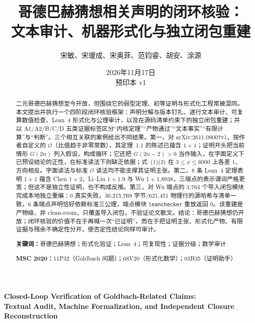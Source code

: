 \documentclass[11pt,a4paper]{ctexart}
\title{\bfseries 哥德巴赫猜想相关声明的闭环核验：\\[2pt]
文本审计、机器形式化与独立闭包重建}
\author{宋敏、宋瑷成、宋奥菲、范钧睿、胡安、涂源}
\date{2026年11月17日\\[2pt]
\small 预印本 v1}
\theoremstyle{plain}
\theoremstyle{definition}
\begin{document}
\maketitle

\begin{abstract}
\noindent
二元哥德巴赫猜想至今开放，但围绕它的弱型定理、初等证明与形式化工程常被混同。本文提出并执行一个四阶段闭环核验框架：声明分解与版本钉扎、逐行文本审计、可复算数值检查、Lean~4 形式化与公理审计，以及在源码清单约束下的独立闭包重建；并以 A1/A2/B/C/D 五类证据标签区分“内核定理”“产物通过”“文本事实”“有限计算”与“判断”。三个相互关联的案例给出不同结果。第一，对 arXiv:2611.09007v1，按作者自定义的 $\mathcal O$（比值趋于非零常数），其定理~1.1 的陈述已蕴含 $1+1$；证明开头把当前情形 $G(2n)$ 列入假设，构成循环；它还把 $G(2n-2)>0$ 当作输入，在字面定义下已预设结论的正性，在标准读法下则缺乏依据；式~(1)(2) 在 $3\le x\le 6000$ 上各差 $1$、方向相反。字面读法与标准 $\mathcal O$ 读法均不能支撑其证明主张。第二，8 条 Lean~4 定理表明 $1+1$ 蕴含 Chen $1+2$、Li--Liu $1+1.9$ 与 Wu $1+1.8938$，三端点的表示谓词严格更宽；但这不是独立性证明，也不构成反推。第三，对 Wu 端点的 3,764 个导入闭包模块完成本地独立重编：0 真实失败，30,215,769 字节/621,451 物理行的源哈希与清单一致，6 条端点声明恰好依赖标准三公理，端点模块 \texttt{leanchecker} 重放返回 0。该重建是产物级、非 clean-room、只覆盖导入闭包，不验证论文散文。结论：哥德巴赫猜想仍开放；闭环核验的价值不在于再喊一次“已证明”，而在于把证明主张、形式化产物、有限证据与残余不确定性分开，使否定性结论同样可审计。

\vspace{0.6em}
\noindent\textbf{关键词：}哥德巴赫猜想；形式化验证；Lean~4；可复现性；证据分级；数学审计

\vspace{0.3em}
\noindent\textbf{MSC 2020：}11P32（Goldbach 问题）；68V20（形式化数学）；03B35（证明助手）
\end{abstract}

\newpage
\begin{center}
{\large\bfseries Closed-Loop Verification of Goldbach-Related Claims:\\[2pt]
Textual Audit, Machine Formalization, and Independent Closure Reconstruction}
\end{center}
\end{document}
